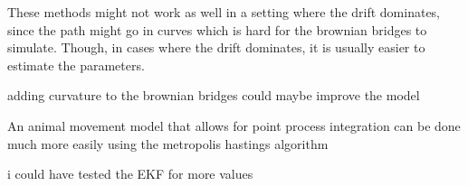 These methods might not work as well in a setting where the drift dominates, since the path might go in curves which is hard for the brownian bridges to simulate. Though, in cases where the drift dominates, it is usually easier to estimate the parameters.


adding curvature to the brownian bridges could maybe improve the model




An animal movement model that allows for point process integration can be done much more easily using the metropolis hastings algorithm

i could have tested the EKF for more values